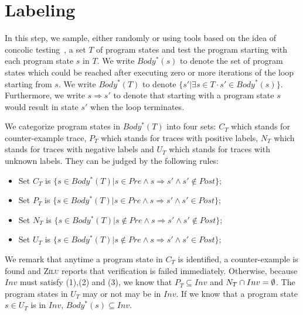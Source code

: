
\section{Labeling}
In this step, we sample, either randomly or using tools based on the idea of concolic testing~\cite{}, 
a set $T$ of program states and test the program starting with each program state $s$ in $T$. 
We write $Body^*(s)$ to denote the set of program states which could be reached after executing zero or more iterations of the loop starting from $s$. 
We write $Body^*(T)$ to denote $\{s' | \exists s \in T \cdot s' \in Body^*(s)\}$. 
Furthermore, we write $s \Rightarrow s'$ to denote that starting with a program state $s$ would result in state $s'$ when the loop terminates. 

We categorize program states in $Body^*(T)$ into four sets:
$C_T$ which stands for counter-example trace, 
$P_T$ which stands for traces with positive labels, 
$N_T$ which stands for traces with negative labels 
and $U_T$ which stands for traces with unknown labels.
They can be judged by the following rules: 
\begin{itemize}
    \item Set $C_T$ is $\{s \in Body^*(T) | s \in Pre \land s \Rightarrow s' \land s' \nin Post\}$;
    \item Set $P_T$ is $\{s \in Body^*(T) | s \in Pre \land s \Rightarrow s' \land s' \in Post\}$;
    \item Set $N_T$ is $\{s \in Body^*(T) | s \nin Pre \land s \Rightarrow s' \land s' \nin Post\}$;
    \item Set $U_T$ is $\{s \in Body^*(T) | s \nin Pre \land s \Rightarrow s' \land s' \in Post\}$;
\end{itemize}
We remark that anytime a program state in $C_T$ is identified, a counter-example is found and \textsc{Zilu} reports that verification is failed immediately. 
Otherwise, because $Inv$ must satisfy (1),(2) and (3), we know that $P_T \subseteq Inv$ and $N_T \cap Inv = \emptyset$. 
The program states in $U_T$ may or not may be in $Inv$. 
If we know that a program state $s \in U_T$ is in $Inv$, $Body^*(s) \subseteq Inv$.

\begin{example}
\end{example}